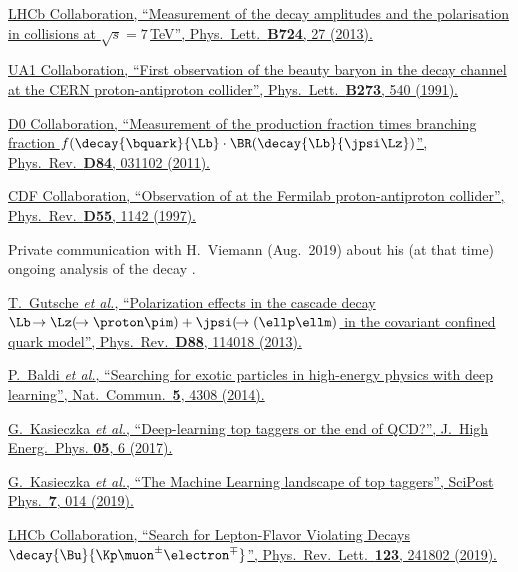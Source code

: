 \href{https://doi.org/10.1016/j.physletb.2013.05.041}{LHCb Collaboration, \enquote{Measurement of the \decay{\Lb}{\jpsi\Lz} decay amplitudes and the \Lb polarisation in \proton\proton collisions at $\sqrt{s} = 7\,$TeV}, Phys.\ Lett.\ \textbf{B724}, 27 (2013).}

\href{https://doi.org/10.1016/0370-2693(91)90311-D}{UA1 Collaboration, \enquote{First observation of the beauty baryon \Lb in the decay channel \decay{\Lb}{\jpsi\Lz} at the CERN proton-antiproton collider}, Phys.\ Lett.\ \textbf{B273}, 540 (1991).}

\href{https://doi.org/10.1103/PhysRevD.84.031102}{D0 Collaboration, \enquote{Measurement of the production fraction times branching fraction $f(\decay{\bquark}{\Lb} \cdot \BR(\decay{\Lb}{\jpsi\Lz})$}, Phys.\ Rev.\ \textbf{D84}, 031102 (2011).}

\href{https://doi.org/10.1103/PhysRevD.55.1142}{CDF Collaboration, \enquote{Observation of \decay{\Lb}{\jpsi\Lz} at the Fermilab proton-antiproton collider}, Phys.\ Rev.\ \textbf{D55}, 1142 (1997).}

Private communication with H.~Viemann (Aug.~2019) about his (at that time) ongoing analysis of the decay \decay{\Lb}{\Dz\proton\Km}.

\href{https://doi.org/10.1103/PhysRevD.88.114018}{T.~Gutsche \textit{et al.}, \enquote{Polarization effects in the cascade decay $\Lb\!\to\Lz(\!\to\proton\pim) + \jpsi(\!\to(\ellp\ellm)$ in the covariant confined quark model}, Phys.\ Rev.\ \textbf{D88}, 114018 (2013).}

\href{https://doi.org/10.1038/ncomms5308}{P.~Baldi \textit{et al.}, \enquote{Searching for exotic particles in high-energy physics with deep learning}, Nat.\ Commun.\ \textbf{5}, 4308 (2014).}

\href{https://doi.org/10.1007/JHEP05(2017)006}{G.~Kasieczka \textit{et al.}, \enquote{Deep-learning top taggers or the end of QCD?}, J.\ High Energ.\ Phys. \textbf{05}, 6 (2017).}

\href{https://doi.org/10.21468/SciPostPhys.7.1.014}{G.~Kasieczka \textit{et al.}, \enquote{The Machine Learning landscape of top taggers}, SciPost Phys.\ \textbf{7}, 014 (2019).}

\href{https://doi.org/10.1103/PhysRevLett.123.241802}{LHCb Collaboration, \enquote{Search for Lepton-Flavor Violating Decays $\decay{\Bu}{\Kp\muon^\pm\electron^\mp}$}, Phys.\ Rev.\ Lett.\ \textbf{123}, 241802 (2019).}

